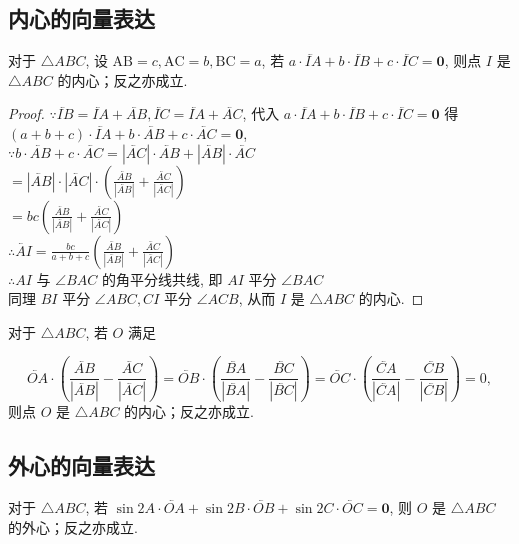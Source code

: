 \subsection{内心的向量表达}
\begin{proposition}
    对于 $\triangle ABC$, 设 $\mathrm{AB}=c, \mathrm{AC}=b, \mathrm{BC}=a$, 若 $a \cdot \lvec{IA}+b \cdot \lvec{IB}+c \cdot \lvec{IC}=\boldsymbol{0}$, 则点 $I$ 是 $\triangle ABC$ 的内心；反之亦成立.
\end{proposition}

\begin{proof}
    $\because \lvec{IB}=\lvec{IA}+\lvec{AB}, \lvec{IC}=\lvec{IA}+\lvec{AC}$, 代入 $a \cdot \lvec{IA}+b \cdot \lvec{IB}+c \cdot \lvec{IC}=\boldsymbol{0}$ 得\\
    $(a+b+c) \cdot \lvec{IA}+b \cdot \lvec{AB}+c \cdot \lvec{AC}=\boldsymbol{0}$,\\
    $\because b \cdot \lvec{AB}+c \cdot \lvec{AC}=|\lvec{AC}| \cdot \lvec{AB}+|\lvec{AB}| \cdot \lvec{AC}$\\
    $=|\lvec{AB}| \cdot|\lvec{AC}| \cdot\left(\frac{\lvec{AB}}{|\lvec{AB}|}+\frac{\lvec{AC}}{|\lvec{AC}|}\right)$\\
    $=bc\left(\frac{\lvec{AB}}{|\lvec{AB}|}+\frac{\lvec{AC}}{|\lvec{AC}|}\right)$\\
    $\therefore \lvec{AI}=\frac{bc}{a+b+c}\left(\frac{\lvec{AB}}{|\lvec{AB}|}+\frac{\lvec{AC}}{|\lvec{AC}|}\right)$\\
    $\therefore AI$ 与 $\angle BAC$ 的角平分线共线, 即 $AI$ 平分 $\angle BAC$\\
    同理 $BI$ 平分 $\angle ABC, CI$ 平分 $\angle ACB$, 从而 $I$ 是 $\triangle ABC$ 的内心.
\end{proof}

\begin{proposition}
    对于 $\triangle ABC$, 若 $O$ 满足

    $$
        \lvec{OA} \cdot\left(\frac{\lvec{AB}}{|\lvec{AB}|}-\frac{\lvec{AC}}{|\lvec{AC}|}\right)=\lvec{OB} \cdot\left(\frac{\lvec{BA}}{|\lvec{BA}|}-\frac{\lvec{BC}}{|\lvec{BC}|}\right)=\lvec{OC} \cdot\left(\frac{\lvec{CA}}{|\lvec{CA}|}-\frac{\lvec{CB}}{|\lvec{CB}|}\right)=0,
    $$
    则点 $O$ 是 $\triangle ABC$ 的内心；反之亦成立.
\end{proposition}

\subsection{外心的向量表达}
\begin{proposition}
    对于 $\triangle ABC$, 若 $\sin 2A \cdot \lvec{OA}+\sin 2B \cdot \lvec{OB}+\sin 2C \cdot \lvec{OC}=\boldsymbol{0}$, 则 $O$ 是 $\triangle ABC$ 的外心；反之亦成立.
\end{proposition}

